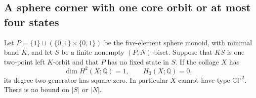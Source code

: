 \subsection{A sphere corner with one core orbit or at most four states}

\begin{proposition}
\label{C:P5-one-core-bisets}
Let $P=\{1\}\sqcup(\{0,1\}\times\{0,1\})$ be the
five-element sphere monoid, with minimal band $K$, and let
$S$ be a finite nonempty $(P,N)$-biset.  Suppose that $KS$
is one two-point left $K$-orbit and that $P$ has no fixed
state in $S$.  If the collage $X$ has
\[
 \dim H^2(X;\mathbb Q)=1,\qquad H_3(X;\mathbb Q)=0,
\]
its degree-two generator has square zero.
In particular $X$ cannot have type $\mathbb{CP}^2$.
There is no bound on $|S|$ or $|N|$.
\end{proposition}

